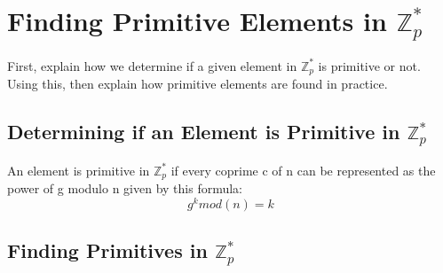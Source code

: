 \documentclass[12pt, letterpaper]{article}
\begin{document}
\section{Finding Primitive Elements in $\mathbb{Z}_p^*$}

First, explain how we determine if a given element in $\mathbb{Z}_p^*$ is primitive or not. 
Using this, then explain how primitive elements are found in practice. 

\subsection{Determining if an Element is Primitive in  $\mathbb{Z}_p^*$}
An element is primitive in  $\mathbb{Z}_p^*$ if every coprime c of n can be represented as the power of g modulo n given by this formula: $$g^k mod(n) = k$$

\subsection{Finding Primitives in  $\mathbb{Z}_p^*$}
\end{document}
